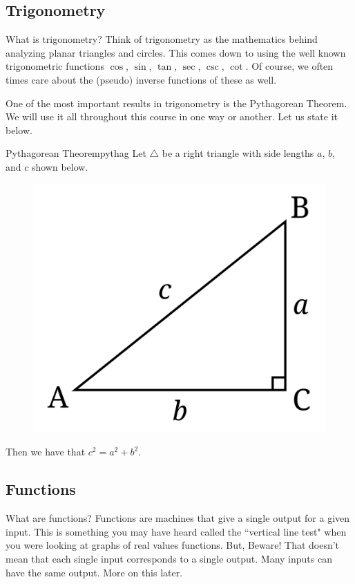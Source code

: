     \subsection{Trigonometry}

    What is trigonometry? Think of trigonometry as the mathematics behind analyzing planar triangles and circles.  This comes down to using the well known trigonometric functions $\cos$, $\sin$, $\tan$, $\sec$, $\csc$, $\cot$. Of course, we often times care about the (pseudo) inverse functions of these as well.

    One of the most important results in trigonometry is the Pythagorean Theorem. We will use it all throughout this course in one way or another.  Let us state it below.

    \begin{thm}{Pythagorean Theorem}{pythag}
    Let $\triangle$ be a right triangle with side lengths $a$, $b$, and $c$ shown below.
    \begin{figure}[H]
        \centering
        \includegraphics[width=.3\textwidth]{Figures_Part_1/right_triangle.png}
    \end{figure}
    Then we have that $c^2=a^2+b^2$.
    \end{thm}




    \subsection{Functions}

    What are functions? Functions are machines that give a single output for a given input. This is something you may have heard called the ``vertical line test" when you were looking at graphs of real values functions. But, Beware! That doesn't mean that each single input corresponds to a single output. Many inputs can have the same output. More on this later.

